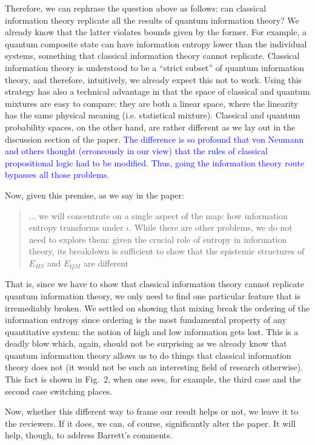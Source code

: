 \documentclass[11pt]{article}
\begin{document}
	Therefore, we can rephrase the question above as follows: can classical information theory replicate all the results of quantum information theory? We already know that the latter violates bounds given by the former. For example, a quantum composite state can have information entropy lower than the individual systems, something that classical information theory cannot replicate. Classical information theory is understood to be a ``strict subset'' of quantum information theory, and therefore, intuitively, we already expect this not to work. Using this strategy has also a technical advantage in that the space of classical and quantum mixtures are easy to compare: they are both a linear space, where the linearity has the same physical meaning (i.e. statistical mixture). Classical and quantum probability spaces, on the other hand, are rather different as we lay out in the discussion section of the paper. \textcolor{blue}{The difference is so profound that von Neumann and others thought (erroneously in our view) that the rules of classical propositional logic had to be modified. Thus, going the information theory route bypasses all those problems.}
	\vspace{2mm}
	
	Now, given this premise, as we say in the paper:
	\begin{quote}
		... we will concentrate on a single aspect of the map: how information entropy transforms under $\iota$. While there are other problems, we do not need to explore them: given the crucial role of entropy in information theory, its breakdown is
		sufficient to show that the epistemic structures of $E_{HS}$
		and $E_{QM}$ are different
	\end{quote}
	That is, since we have to show that classical information theory cannot replicate quantum information theory, we only need to find one particular feature that is irremediably broken. We settled on showing that mixing break the ordering of the information entropy since ordering is the most fundamental property of any quantitative system: the notion of high and low information gets lost. This is a deadly blow which, again, should not be surprising as we already know that quantum information theory allows us to do things that classical information theory does not (it would not be such an interesting field of research otherwise). This fact is shown in Fig.~2, when one sees, for example, the third case and the second case switching places.
	
	Now, whether this different way to frame our result helps or not, we leave it to the reviewers. If it does, we can, of course, significantly alter the paper. It will help, though, to address Barrett's comments.
\end{document}
